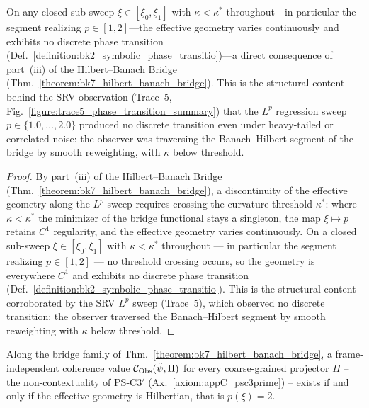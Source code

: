 \begin{corollary}
\label{corollary:bk7_bridge_no_interior_transition}
On any closed sub-sweep $\xi\in[\xi_{0},\xi_{1}]$ with $\kappa<\kappa^{\ast}$
throughout---in particular the segment realizing $p\in[1,2]$---the effective
geometry varies continuously and exhibits no discrete phase transition
(Def.~\ref{definition:bk2_symbolic_phase_transitio})---a direct consequence of
part~(iii) of the Hilbert--Banach Bridge (Thm.~\ref{theorem:bk7_hilbert_banach_bridge}).
This is the
structural content behind the SRV observation (Trace~5,
Fig.~\ref{figure:trace5_phase_transition_summary}) that the $L^{p}$ regression
sweep $p\in\{1.0,\dots,2.0\}$ produced no discrete transition even under
heavy-tailed or correlated noise: the observer was traversing the Banach--Hilbert
segment of the bridge by smooth reweighting, with $\kappa$ below threshold.
\end{corollary}
\begin{proof}
\label{proof:bk7_bridge_no_interior_transition}
\leavevmode
By part~(iii) of the Hilbert--Banach Bridge (Thm.~\ref{theorem:bk7_hilbert_banach_bridge}), a discontinuity of the effective geometry along the $L^p$ sweep requires crossing the curvature threshold $\kappa^\ast$: where $\kappa<\kappa^\ast$ the minimizer of the bridge functional stays a singleton, the map $\xi\mapsto p$ retains $C^1$ regularity, and the effective geometry varies continuously. On a closed sub-sweep $\xi\in[\xi_0,\xi_1]$ with $\kappa<\kappa^\ast$ throughout --- in particular the segment realizing $p\in[1,2]$ --- no threshold crossing occurs, so the geometry is everywhere $C^1$ and exhibits no discrete phase transition (Def.~\ref{definition:bk2_symbolic_phase_transitio}). This is the structural content corroborated by the SRV $L^p$ sweep (Trace~5), which observed no discrete transition: the observer traversed the Banach--Hilbert segment by smooth reweighting with $\kappa$ below threshold.
\end{proof}

\begin{lemma}
\label{lemma:bk7_noncontextuality_forces_hilbert}
Along the bridge family of Thm.~\ref{theorem:bk7_hilbert_banach_bridge}, a
frame-independent coherence value $\mathcal{C}_{\mathrm{Obs}}(\tilde\psi,\Pi)$ for every
coarse-grained projector $\Pi$ -- the non-contextuality of PS-C3$'$
(Ax.~\ref{axiom:appC_psc3prime}) -- exists if and only if the effective geometry is
Hilbertian, that is $p(\xi)=2$.
\end{lemma}

